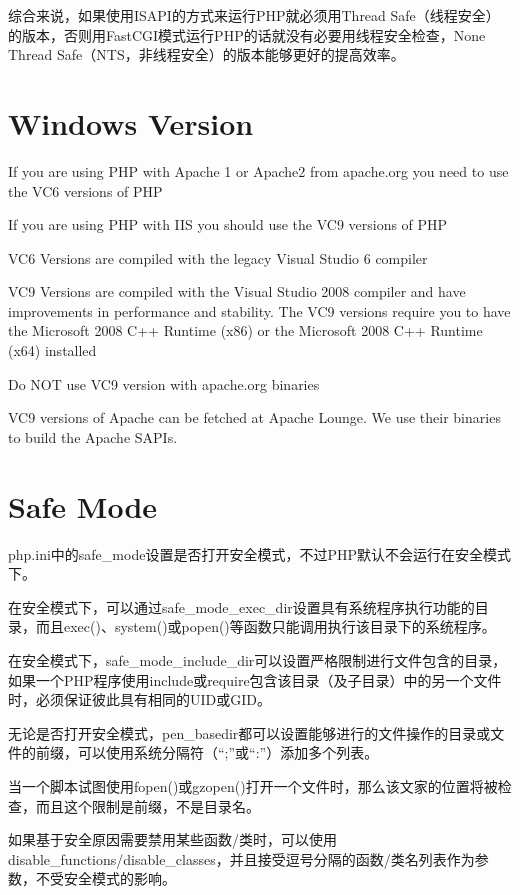 综合来说，如果使用ISAPI的方式来运行PHP就必须用Thread Safe（线程安全）的版本，否则用FastCGI模式运行PHP的话就没有必要用线程安全检查，None Thread Safe（NTS，非线程安全）的版本能够更好的提高效率。



\section{Windows Version}

If you are using PHP with Apache 1 or Apache2 from apache.org you need to use the VC6 versions of PHP

If you are using PHP with IIS you should use the VC9 versions of PHP

VC6 Versions are compiled with the legacy Visual Studio 6 compiler

VC9 Versions are compiled with the Visual Studio 2008 compiler and have improvements in performance and stability. The VC9 versions require you to have the Microsoft 2008 C++ Runtime (x86) or the Microsoft 2008 C++ Runtime (x64) installed

Do NOT use VC9 version with apache.org binaries

VC9 versions of Apache can be fetched at Apache Lounge. We use their binaries to build the Apache SAPIs.


\section{Safe Mode}

php.ini中的safe\_mode设置是否打开安全模式，不过PHP默认不会运行在安全模式下。

在安全模式下，可以通过safe\_mode\_exec\_dir设置具有系统程序执行功能的目录，而且exec()、system()或popen()等函数只能调用执行该目录下的系统程序。

在安全模式下，safe\_mode\_include\_dir可以设置严格限制进行文件包含的目录，如果一个PHP程序使用include或require包含该目录（及子目录）中的另一个文件时，必须保证彼此具有相同的UID或GID。

无论是否打开安全模式，pen\_basedir都可以设置能够进行的文件操作的目录或文件的前缀，可以使用系统分隔符（“;”或“:”）添加多个列表。

当一个脚本试图使用fopen()或gzopen()打开一个文件时，那么该文家的位置将被检查，而且这个限制是前缀，不是目录名。

如果基于安全原因需要禁用某些函数/类时，可以使用disable\_functions/disable\_classes，并且接受逗号分隔的函数/类名列表作为参数，不受安全模式的影响。










